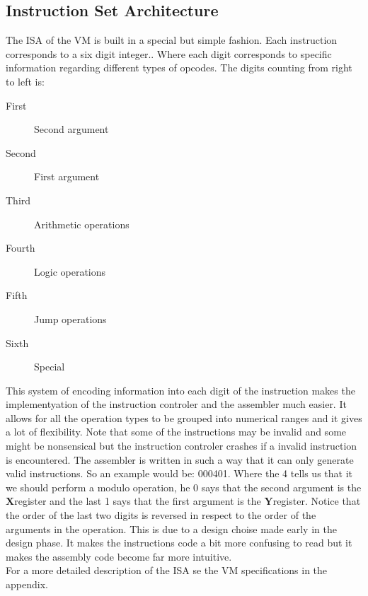 \documentclass{article}
\newcommand{\x}{$\textbf{X}$}
\newcommand{\y}{$\textbf{Y}$}
\begin{document}
\subsection{Instruction Set Architecture}
The ISA of the VM is built in a special but simple fashion. Each instruction
corresponds to a six digit integer..
Where each digit corresponds to specific information regarding different types of opcodes. The digits counting from right
to left is: 

\begin{description}
  \item[First] Second argument
  \item[Second] First argument
  \item[Third] Arithmetic operations
  \item[Fourth] Logic operations
  \item[Fifth] Jump operations
  \item[Sixth] Special
\end{description}
This system of encoding information into each digit of the instruction makes the
implementyation of the instruction controler and the assembler much easier. It
allows for all the operation types to be grouped into numerical ranges and it
gives  a lot of flexibility. Note that some of the instructions may be invalid
and some might be nonsensical but the instruction controler crashes if a invalid
instruction is encountered. The assembler is written in such a way that it can
only generate valid instructions. So an example would be:
000401.
Where the 4 tells us that it we should perform a modulo operation, 
he 0 says that the second argument is the \x register and the last 1 says 
that the first argument is the \y register. Notice that the order of
the last two digits is reversed in respect to the order of the arguments in
the operation.
This is due to a design choise made early in the design phase. It makes the
instructions code a bit more confusing to read but it makes the assembly code
become far more intuitive.\\
For a more detailed description of the ISA se the VM specifications in the
appendix.
\end{document}
